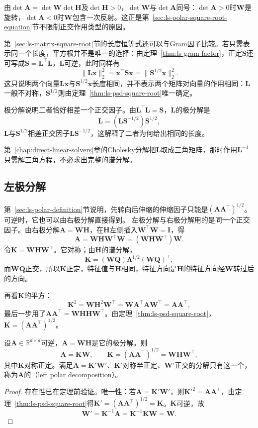 由$\det\bm A=\det\bm W\det\bm H$及$\det\bm H>0$，$\det\bm W$与$\det\bm A$同号：$\det\bm A>0$时$\bm W$是旋转，$\det\bm A<0$时$\bm W$包含一次反射。这正是第~\ref{sec:ls-polar-square-root-equation}节不限制正交作用类型的原因。

第~\ref{sec:ls-matrix-square-root}节的长度恒等式还可以与Gram因子比较。若只需表示同一个长度，平方根并不是唯一的选择：由定理~\ref{thm:ls-gram-factor}，正定$\bm S$还可写成$\bm S=\bm L^\top\bm L$，$\bm L$可逆，此时同样有
\[
 \lVert\bm L\bm x\rVert_2^2=\bm x^\top\bm S\bm x=\lVert\bm S^{1/2}\bm x\rVert_2^2 .
\]
这只说明两个向量$\bm L\bm x$与$\bm S^{1/2}\bm x$长度相同，并不表示两个矩阵对向量的作用相同：$\bm L$一般不对称，$\bm S^{1/2}$则由定理~\ref{thm:ls-psd-square-root}唯一确定。

极分解说明二者恰好相差一个正交因子。由$\bm L^\top\bm L=\bm S$，$\bm L$的极分解是
\[
 \bm L=(\bm L\bm S^{-1/2})\bm S^{1/2},
\]$\bm L$与$\bm S^{1/2}$相差正交因子$\bm L\bm S^{-1/2}$，这解释了二者为何给出相同的长度。

第~\ref{chap:direct-linear-solvers}章的Cholesky分解把$\bm L$取成三角矩阵，那时作用$\bm L^{-1}$只需解三角方程，不必求出完整的谱分解。

\subsection{左极分解}
\label{sec:ls-polar-left}

第~\ref{sec:ls-polar-definition}节说明，先转向后伸缩的伸缩因子只能是$(\bm A\bm A^\top)^{1/2}$。可逆时，它也可以由右极分解直接得到。
左极分解与右极分解用的是同一个正交因子。由右极分解$\bm A=\bm W\bm H$，在$\bm H$左侧插入$\bm W^\top\bm W=\bm I$，得
\[
 \bm A=\bm W\bm H\bm W^\top\bm W=(\bm W\bm H\bm W^\top)\bm W .
\]
令$\bm K=\bm W\bm H\bm W^\top$。它对称；由$\bm H$的谱分解，
\[
 \bm K=(\bm W\bm Q)\bm\Lambda^{1/2}(\bm W\bm Q)^\top ,
\]
而$\bm W\bm Q$正交，所以$\bm K$正定，特征值与$\bm H$相同，特征方向是$\bm H$的特征方向经$\bm W$转过后的方向。

再看$\bm K$的平方：
\[
 \bm K^2=\bm W\bm H^2\bm W^\top=\bm W\bm A^\top\bm A\bm W^\top=\bm A\bm A^\top ,
\]
最后一步用了$\bm A\bm A^\top=\bm W\bm H\bm H\bm W^\top$。由定理~\ref{thm:ls-psd-square-root}，$\bm K=(\bm A\bm A^\top)^{1/2}$。

\begin{theorem}[左极分解]
\label{thm:polar-left-invertible}
设$\bm A\in\mathbb R^{d\times d}$可逆，$\bm A=\bm W\bm H$是它的极分解。则
\begin{equation}
 \bm A=\bm K\bm W,\qquad\bm K=(\bm A\bm A^\top)^{1/2}=\bm W\bm H\bm W^\top ,
 \label{eq:ls-polar-left}
\end{equation}
其中$\bm K$对称正定。满足$\bm A=\bm K'\bm W'$、$\bm K'$对称半正定、$\bm W'$正交的分解只有这一个，称为$\bm A$的（left polar decomposition）。
\end{theorem}
\begin{proof}
存在性已在定理前验证。唯一性：若$\bm A=\bm K'\bm W'$，则$\bm K'^2=\bm A\bm A^\top$，由定理~\ref{thm:ls-psd-square-root}得$\bm K'=(\bm A\bm A^\top)^{1/2}=\bm K$。$\bm K$可逆，故
\[
 \bm W'=\bm K^{-1}\bm A=\bm K^{-1}\bm K\bm W=\bm W .
\]
\end{proof}

